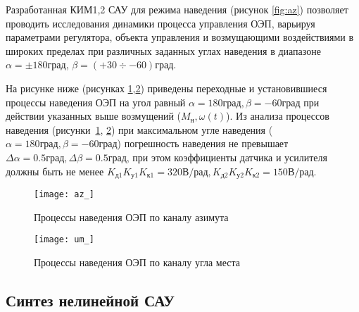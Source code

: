 Разработанная КИМ1,2 САУ для режима наведения (рисунок \ref{fig:az}) позволяет проводить исследования динамики процесса управления ОЭП, варьируя параметрами регулятора, объекта управления и возмущающими воздействиями в широких пределах при различных заданных углах наведения в диапазоне  \( \alpha = \pm 180 \textit{град}\), \( \beta = (+30 \div -60) \textit{град}\).

На рисунке ниже (рисунках \ref{fig:az_},\ref{fig:um_}) приведены переходные и установившиеся процессы наведения ОЭП на угол равный \( \alpha = 180  \textit{град}, \beta = -60  \textit{град} \) при действии указанных выше возмущений ($M_{\textit{н}}, \omega(t)$). Из анализа процессов наведения (рисунки~\ref{fig:az_}, \ref{fig:um_}) при максимальном угле наведения (\( \alpha = 180  \textit{град}, \beta = -60  \textit{град} \)) погрешность наведения не превышает $\Delta \alpha = 0.5 \textit{град}, \Delta \beta = 0.5 \textit{град}$, при этом коэффициенты датчика и усилителя должны быть не менее $K_{\textit{д1}} K_{\textit{у1}} K_{\textit{к1}} = 320 \textit{В/рад}, K_{\textit{д2}} K_{\textit{у2}} K_{\textit{к2}} = 150 \textit{В/рад}$.

\begin{figure}[ht]
	\centering
	\texttt{[image: az\_]} 
	\caption{Процессы наведения ОЭП по каналу азимута}
	\label{fig:az_}
\end{figure}

\begin{figure}[ht]
	\centering
	\texttt{[image: um\_]} 
	\caption{Процессы наведения ОЭП по каналу угла места}
	\label{fig:um_}
\end{figure}

\subsection{Синтез нелинейной САУ} \label{subsec:ch4/sect4/sub2}

